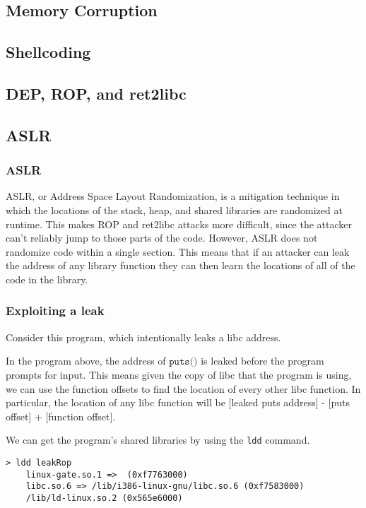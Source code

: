 \subsection{Memory Corruption}

\subsection{Shellcoding}

\subsection{DEP, ROP, and ret2libc}

\subsection{ASLR}
\subsubsection{ASLR}
ASLR, or Address Space Layout Randomization, is a mitigation technique in which
the locations of the stack, heap, and shared libraries are randomized at
runtime. This makes ROP and ret2libc attacks more difficult, since the attacker
can't reliably jump to those parts of the code. However, ASLR does not randomize
code within a single section. This means that if an attacker can leak the
address of any library function they can then learn the locations of all of the
code in the library.

\subsubsection{Exploiting a leak}
Consider this program, which intentionally leaks a libc address.

In the program above, the address of $\texttt{puts()}$ is leaked before the
program prompts for input. This means given the copy of libc that the program is
using, we can use the function offsets to find the location of every other libc
function. In particular, the location of any libc function will be
[leaked puts address] - [puts offset] + [function offset].

We can get the program's shared libraries by using the \texttt{ldd} command.
\begin{lstlisting}
> ldd leakRop
    linux-gate.so.1 =>  (0xf7763000)
    libc.so.6 => /lib/i386-linux-gnu/libc.so.6 (0xf7583000)
    /lib/ld-linux.so.2 (0x565e6000)
\end{lstlisting}

